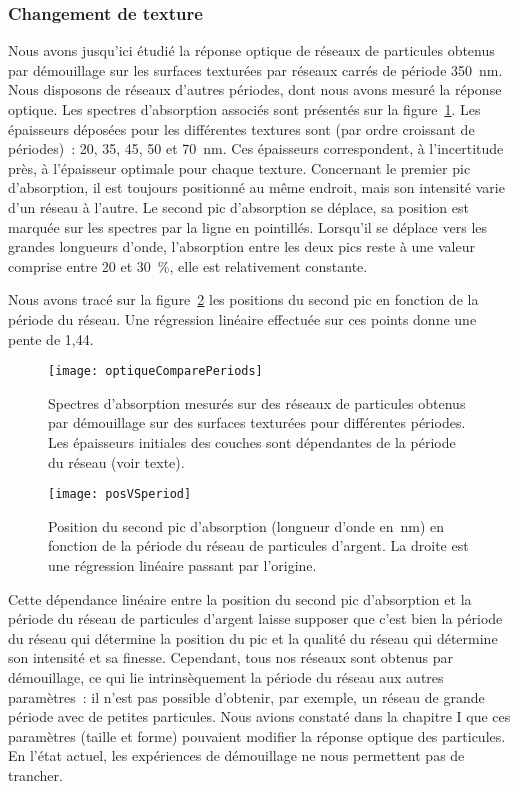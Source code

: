 	\subsubsection{Changement de texture}
Nous avons jusqu'ici étudié la réponse optique de réseaux de particules obtenus par démouillage sur les surfaces texturées par réseaux carrés de période 350~nm. Nous disposons de réseaux d'autres périodes, dont nous avons mesuré la réponse optique. Les spectres d'absorption associés sont présentés sur la figure~\ref{optiqueComparePeriods}. Les épaisseurs déposées pour les différentes textures sont (par ordre croissant de périodes)~: 20, 35, 45, 50 et 70~nm. Ces épaisseurs correspondent, à l'incertitude près, à l'épaisseur optimale pour chaque texture. Concernant le premier pic d'absorption, il est toujours positionné au même endroit, mais son intensité varie d'un réseau à l'autre. Le second pic d'absorption se déplace, sa position est marquée sur les spectres par la ligne en pointillés. Lorsqu'il se déplace vers les grandes longueurs d'onde, l'absorption entre les deux pics reste à une valeur comprise entre 20 et 30~\%, elle est relativement constante.\par
Nous avons tracé sur la figure~\ref{posVSperiod} les positions du second pic en fonction de la période du réseau. Une régression linéaire effectuée sur ces points donne une pente de 1,44.\par 
\begin{figure}[!htb]
\centering
\texttt{[image: optiqueComparePeriods]}
\caption{Spectres d'absorption mesurés sur des réseaux de particules obtenus par démouillage sur des surfaces texturées pour différentes périodes. Les épaisseurs initiales des couches sont dépendantes de la période du réseau (voir texte).}
\label{optiqueComparePeriods}
\end{figure}
\begin{figure}[!htb]
\centering
\texttt{[image: posVSperiod]}
\caption{Position du second pic d'absorption (longueur d'onde en~nm) en fonction de la période du réseau de particules d'argent. La droite est une régression linéaire passant par l'origine.}
\label{posVSperiod}
\end{figure}
Cette dépendance linéaire entre la position du second pic d'absorption et la période du réseau de particules d'argent laisse supposer que c'est bien la période du réseau qui détermine la position du pic et la qualité du réseau qui détermine son intensité et sa finesse. Cependant, tous nos réseaux sont obtenus par démouillage, ce qui lie intrinsèquement la période du réseau aux autres paramètres~: il n'est pas possible d'obtenir, par exemple, un réseau de grande période avec de petites particules. Nous avions constaté dans la chapitre I que ces paramètres (taille et forme) pouvaient modifier la réponse optique des particules. En l'état actuel, les expériences de démouillage ne nous permettent pas de trancher.\par 


